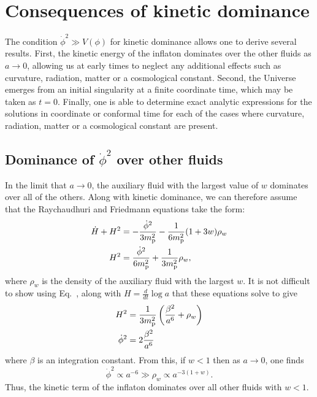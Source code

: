 \section{Consequences of kinetic dominance}
\label{sec:consequences_of_kinetic_dominance}

The condition $\dot\phi^2\gg V(\phi)$ for kinetic dominance allows one
to derive several results. First, the kinetic energy of the inflaton
dominates over the other fluids as $a\to 0$, allowing us at early
times to neglect any additional effects such as curvature, radiation,
matter or a cosmological constant. Second, the Universe emerges from
an initial singularity at a finite coordinate time, which may be taken
as $t=0$. Finally, one is able to determine exact analytic expressions
for the solutions in coordinate or conformal time for each of the
cases where curvature, radiation, matter or a cosmological constant
are present.


\subsection{Dominance of $\dot{\phi}^2$ over other fluids}
\label{sec:dominance_fluids}
In the limit that $a\to 0$, the auxiliary fluid with the largest value
of $w$ dominates over all of the others. Along with kinetic dominance,
we can therefore assume that the Raychaudhuri
 and Friedmann 
equations take the form:
%
\begin{align}
  \dot{H}+H^2 
  &= 
  -\frac{\dot{\phi}^2}{3m_{\mathrm{p}}^2} - \frac{1}{6m_{\mathrm{p}}^2}(1+3w)\rho_w
  \label{eqn:Ray_KD_eq_rho}
  \\
  H^2 
  &= 
  \frac{\dot{\phi}^2}{6m_{\mathrm{p}}^2} +  \frac{1}{3m_{\mathrm{p}}^2}\rho_w,
  \label{eqn:Friedmann_KD_eq_rho}
\end{align}
%
where $\rho_w$ is the density of the auxiliary fluid with the largest
$w$.  It is not difficult to show using Eq.\ ,
along with $H=\frac{d}{dt}\log a$ that these equations solve to give
%
\begin{align}
  H^2 
  &= 
  \frac{1}{3m_{\mathrm{p}}^2}\left(\frac{\beta^2}{a^6} + \rho_w\right) 
  \label{eqn:H_of_a_1}
  \\
  \dot{\phi}^2 
  &= 
  2\frac{\beta^2}{a^6} 
  \label{eqn:dotphi_of_a_1}
\end{align}
%
where $\beta$ is an integration constant. From this, if $w<1$ then as
$a\to 0$, one finds
%
\begin{equation}
  \dot{\phi}^2 \propto a^{-6} 
  \gg
  \rho_w \propto a^{-3(1+w)}.
  \label{eqn:dotphidom}
\end{equation}
%
Thus, the kinetic term of the inflaton dominates over all other fluids
with $w<1$.




